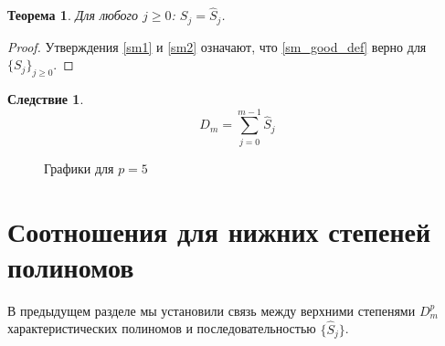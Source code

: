 \documentclass[14pt, a4paper, russian]{report}
\newtheorem{theorem}{\indent Теорема}
\newtheorem{corollary}{\indent Следствие}
\begin{document}
\begin{theorem} \label{subst_th}
Для любого $j \ge 0$: $S_j=\hat{S}_j$.
\end{theorem}
\begin{proof}
Утверждения \cref{sm1} и \cref{sm2} означают, что \cref{sm_good_def} верно для $\{S_j\}_{j \ge 0}$.
\end{proof}
\begin{corollary}\label{D_sum}
$$D_m = \sum\limits_{j=0}^{m-1} \hat{S}_j$$
\end{corollary}
\begin{figure}[H]
    \caption{\footnotesize{Графики для $p = 5$}}
\label{fig:degrees}
\end{figure}
\section{Соотношения для нижних степеней полиномов}

В предыдущем разделе мы установили связь между верхними степенями $D_m^p$ характеристических полиномов и последовательностью $\{\hat{S}_j\}$. 
\end{document}
